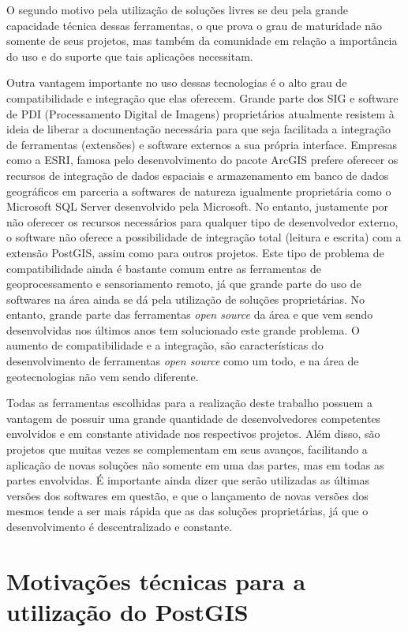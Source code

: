 O segundo motivo pela utilização de soluções livres se deu pela grande capacidade técnica dessas ferramentas, o que prova o grau de maturidade não somente de seus projetos, mas também da comunidade em relação a importância do uso e do suporte que tais aplicações necessitam. 

Outra vantagem importante no uso dessas tecnologias é o alto grau de compatibilidade e integração que elas oferecem. Grande parte dos SIG e software de PDI (Processamento Digital de Imagens) proprietários atualmente resistem à ideia de liberar a documentação necessária para que seja facilitada a integração de ferramentas (extensões) e software externos a sua própria interface. Empresas como a ESRI, famosa pelo desenvolvimento do pacote ArcGIS prefere oferecer os recursos de integração de dados espaciais e armazenamento em banco de dados geográficos em parceria a softwares de natureza igualmente proprietária como o Microsoft SQL Server desenvolvido pela Microsoft. No entanto, justamente por não oferecer os recursos necessários para qualquer tipo de desenvolvedor externo, o software não oferece a possibilidade de integração total (leitura e escrita) com a extensão PostGIS, assim como para outros projetos. Este tipo de problema de compatibilidade ainda é bastante comum entre as ferramentas de geoprocessamento e sensoriamento remoto, já que grande parte do uso de softwares na área ainda se dá pela utilização de soluções proprietárias. No entanto, grande parte das ferramentas \textit{open source} da área e que vem sendo desenvolvidas nos últimos anos tem solucionado este grande problema. O aumento de compatibilidade e a integração, são características do desenvolvimento de ferramentas\textit{ open source} como um todo, e na área de geotecnologias não vem sendo diferente.

Todas as ferramentas escolhidas para a realização deste trabalho possuem a vantagem de possuir uma grande quantidade de desenvolvedores competentes envolvidos e em constante atividade nos respectivos projetos. Além disso, são projetos que muitas vezes se complementam em seus avanços, facilitando a aplicação de novas soluções não somente em uma das partes, mas em todas as partes envolvidas. É importante ainda dizer que serão utilizadas as últimas versões dos softwares em questão, e que o lançamento de novas versões dos mesmos tende a ser mais rápida que as das soluções proprietárias, já que o desenvolvimento é descentralizado e constante.

\section{Motivações técnicas para a utilização do PostGIS}

